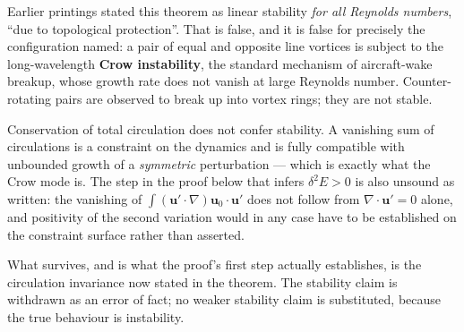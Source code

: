 \begin{remark}
\label{rem:crow-2026-10-03}
Earlier printings stated this theorem as linear stability \emph{for all Reynolds
numbers}, ``due to topological protection''. That is false, and it is false for
precisely the configuration named: a pair of equal and opposite line vortices is
subject to the long-wavelength \textbf{Crow instability}, the standard mechanism
of aircraft-wake breakup, whose growth rate does not vanish at large Reynolds
number. Counter-rotating pairs are observed to break up into vortex rings; they
are not stable.

Conservation of total circulation does not confer stability. A vanishing sum of
circulations is a constraint on the dynamics and is fully compatible with
unbounded growth of a \emph{symmetric} perturbation --- which is exactly what the
Crow mode is. The step in the proof below that infers
$\delta^2 E > 0$ is also unsound as written: the vanishing of
$\int (\mathbf{u}'\cdot\nabla)\mathbf{u}_0 \cdot \mathbf{u}'$ does not follow from
$\nabla\cdot\mathbf{u}' = 0$ alone, and positivity of the second variation would
in any case have to be established on the constraint surface rather than
asserted.

What survives, and is what the proof's first step actually establishes, is the
circulation invariance now stated in the theorem. The stability claim is
withdrawn as an error of fact; no weaker stability claim is substituted, because
the true behaviour is instability.
\end{remark}

